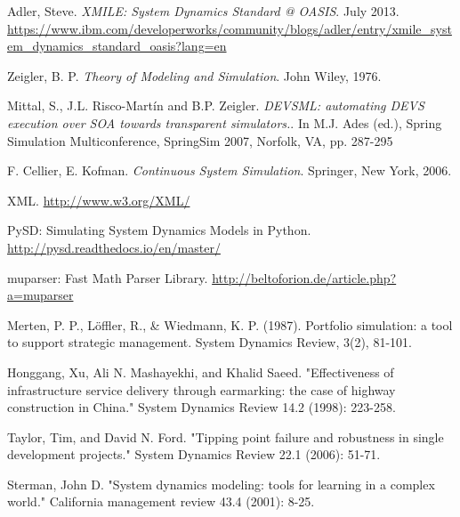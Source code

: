 \begin{thebibliography}{9}

  Adler, Steve. \textit{XMILE: System Dynamics Standard @ OASIS}. July 2013.   \url{https://www.ibm.com/developerworks/community/blogs/adler/entry/xmile_system_dynamics_standard_oasis?lang=en}

  Zeigler, B. P. \textit{Theory of Modeling and Simulation}. John Wiley, 1976.

  Mittal, S., J.L. Risco-Martín and B.P. Zeigler. \textit{DEVSML: automating DEVS execution over SOA towards transparent simulators.}. In M.J. Ades (ed.), Spring Simulation Multiconference, SpringSim 2007, Norfolk, VA, pp. 287-295

 F. Cellier, E. Kofman. \textit{Continuous System Simulation}. Springer, New York, 2006.

  XML. \url{http://www.w3.org/XML/}
 
 PySD: Simulating System Dynamics Models in Python. \url{http://pysd.readthedocs.io/en/master/}
 
 muparser: Fast Math Parser Library. \url{http://beltoforion.de/article.php?a=muparser}

    Merten, P. P., Löffler, R., \& Wiedmann, K. P. (1987). Portfolio simulation: a tool to support strategic management. System Dynamics Review, 3(2), 81-101.

Honggang, Xu, Ali N. Mashayekhi, and Khalid Saeed. "Effectiveness of infrastructure service delivery through earmarking: the case of highway construction in China." System Dynamics Review 14.2 (1998): 223-258.

Taylor, Tim, and David N. Ford. "Tipping point failure and robustness in single development projects." System Dynamics Review 22.1 (2006): 51-71.

    Sterman, John D. "System dynamics modeling: tools for learning in a complex world." California management review 43.4 (2001): 8-25.
\end{thebibliography}
